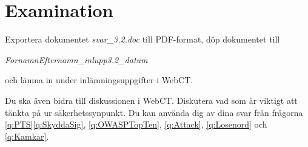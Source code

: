 \documentclass[11pt,a4paper]{miunasgn}
\begin{document}
\section{Examination}
\label{sec:Examination}
\noindent
Exportera dokumentet \emph{svar\_3.2.doc} till PDF-format, döp dokumentet till
\begin{center}
	\emph{FornamnEfternamn\_inlupp3.2\_datum}
\end{center}
och lämna in under inlämningsuppgifter i WebCT.

Du ska även bidra till diskussionen i WebCT.
Diskutera vad som är viktigt att tänkta på ur säkerhetssynpunkt.
Du kan använda dig av dina svar från frågorna
\ref{q:PTS}\ref{q:SkyddaSig},
\ref{q:OWASPTopTen},
\ref{q:Attack},
\ref{q:Losenord} och
\ref{q:Kamkar}.



\end{document}
